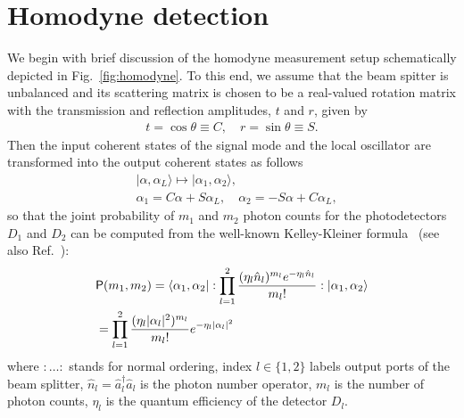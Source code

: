 \documentclass[%
reprint,
superscriptaddress,
 amsmath,amssymb,amsfonts,
 aps,
 pra,
 longbibliography
]{revtex4-2}
\newcommand{\ket}[1]{\ensuremath{|{#1}\rangle}}
\newcommand{\bra}[1]{\ensuremath{\langle{#1}|}}
\newcommand{\hcnj}[1]{{#1}^{\dagger}}
\newcommand{\prob}{\mathsf{P}}
\begin{document}
\section{Homodyne detection}
\label{sec:homodyne} 


We begin with brief discussion
of the homodyne measurement setup
schematically depicted in Fig.~\ref{fig:homodyne}.
To this end, we assume that the beam spitter is unbalanced
and its scattering matrix is chosen to be a real-valued
rotation matrix with the transmission and reflection amplitudes,
$t$ and $r$, given by
\begin{align}
  \label{eq:BS-amplitudes}
  t=\cos\theta\equiv C,
  \quad
  r=\sin\theta\equiv S.
\end{align}
Then the input coherent states
of the signal mode and the local oscillator 
are transformed into the output coherent states
as follows
\begin{align}
  \label{eq:BS}
  &
    \ket{\alpha,\alpha_L}\mapsto\ket{\alpha_1,\alpha_2},
  \\
  &
    \label{eq:amplitudes}
    \alpha_1=C\alpha+S\alpha_L,\quad
    \alpha_2=-S\alpha+C\alpha_L,
\end{align}
so that
the joint probability of $m_1$ and $m_2$ photon counts
for the photodetectors $D_1$ and $D_2$
can be computed from the well-known Kelley-Kleiner formula~\cite{Kelley:pr:1964}
(see also Ref.~\cite{Vogel:pra:1993}):
\begin{align}
  &
    \label{eq:1}
    \prob(m_1,m_2)=
    \bra{\alpha_1,\alpha_2}:\prod_{l=1}^{2}\frac{(\eta_l\hat{n}_l)^{m_l}e^{-\eta_l\hat{n}_l}}{m_l!}:\ket{\alpha_1,\alpha_2}
    \notag
  \\
  &
 =\prod_{l=1}^{2}\frac{(\eta_l|\alpha_l|^2)^{m_l}}{m_l!}e^{-\eta_l|\alpha_l|^2}    
\end{align}
where
$:\ldots:$ stands for normal ordering,
index $l\in\{1,2\}$ labels output ports of the beam splitter,
$\hat{n}_l=\hcnj{\hat{a}}_l\hat{a}_l$ is the photon number operator,
$m_l$ is the number of photon counts,
$\eta_l$ is the quantum efficiency of the detector $D_l$.
\end{document}
